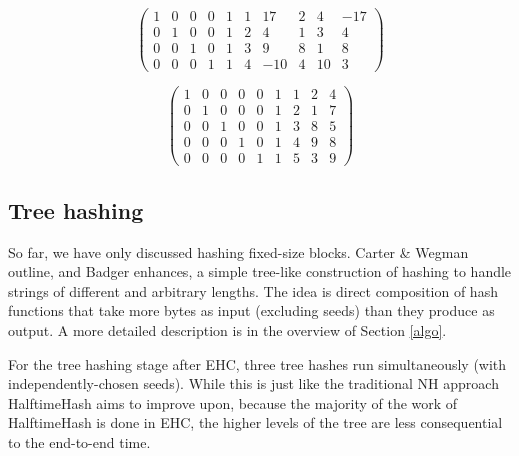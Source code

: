 \documentclass[sigconf, nonacm]{acmart}
\begin{document}
\[
\left(
\begin{array}{rrrrrrrrrr}
  1 &  0 &   0&   0&   1&   1&  17&   2&   4& -17 \\
  0  & 1&   0  & 0&   1  & 2&   4  & 1&   3  & 4\\
  0 &  0 &  1 &  0 &  1 &  3 &  9 &  8 &  1 &  8\\
  0&   0  & 0&   1  & 1&   4 &-10&   4  &10&   3
\end{array}
\right)
\]

\[
\left(
\begin{array}{rrrrrrrrr}
 1 & 0 & 0 & 0 & 0 & 1 & 1 & 2 & 4\\
 0 & 1 & 0 & 0 & 0 & 1 & 2 & 1 & 7\\
 0 & 0 & 1 & 0 & 0 & 1 & 3 & 8 & 5\\
 0 & 0 & 0 & 1 & 0 & 1 & 4 & 9 & 8\\
 0 & 0 & 0 & 0 & 1 & 1 & 5 & 3 & 9
\end{array}
\right)
\]


\subsection{Tree hashing}

So far, we have only discussed hashing fixed-size blocks.
Carter \& Wegman outline, and Badger enhances, a simple tree-like construction of hashing to handle strings of different and arbitrary lengths. \cite{badger,carter-wegman-79}
The idea is direct composition of hash functions that take more bytes as input (excluding seeds) than they produce as output.
A more detailed description is in the overview of Section \ref{algo}.

For the tree hashing stage after EHC, three tree hashes run simultaneously (with independently-chosen seeds).
While this is just like the traditional NH approach HalftimeHash aims to improve upon, because the majority of the work of HalftimeHash is done in EHC, the higher levels of the tree are less consequential to the end-to-end time.


\end{document}
